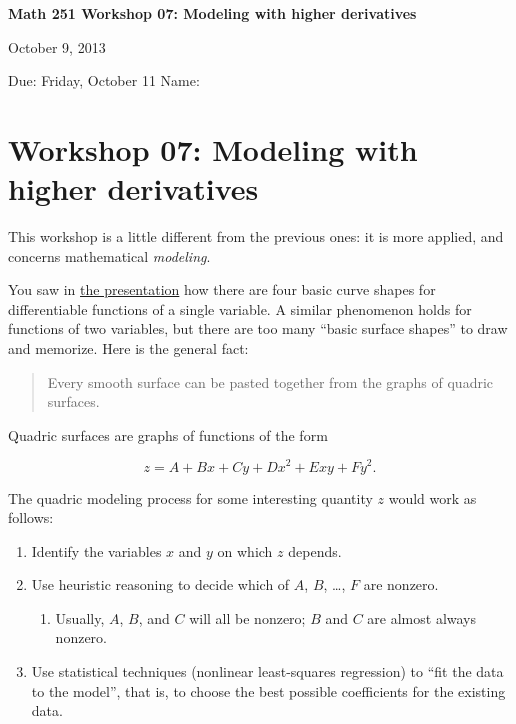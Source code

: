 \documentclass[12pt]{exam}
\theoremstyle{definition}
\begin{document}
\noindent
\textbf{{\large Math 251 \hfill Workshop 07: Modeling with higher derivatives}}

\noindent
October 9, 2013 

\noindent
Due: Friday, October 11 \hfill Name: \underline{\hspace{3in}} 

\noindent

\section{Workshop 07: Modeling with higher derivatives}

This workshop is a little different from the previous ones: it is more
applied, and concerns mathematical \emph{modeling}.

You saw in \href{../../decks/08/Deck.pdf}{the presentation} how there
are four basic curve shapes for differentiable functions of a single
variable. A similar phenomenon holds for functions of two variables, but
there are too many ``basic surface shapes'' to draw and memorize. Here
is the general fact:

\begin{quote}
Every smooth surface can be pasted together from the graphs of quadric
surfaces.
\end{quote}

Quadric surfaces are graphs of functions of the form

\[z = A + Bx + Cy + Dx^2 + Exy + Fy^2.\]

The quadric modeling process for some interesting quantity $z$ would
work as follows:

\begin{enumerate}
\def\labelenumi{\arabic{enumi}.}
\itemsep1pt\parskip0pt
\item
  Identify the variables $x$ and $y$ on which $z$ depends.
\item
  Use heuristic reasoning to decide which of $A$, $B$, \ldots{}, $F$ are
  nonzero.

  \begin{enumerate}
  \def\labelenumii{\alph{enumii}.}
  \itemsep1pt\parskip0pt
  \item
    Usually, $A$, $B$, and $C$ will all be nonzero; $B$ and $C$ are
    almost always nonzero.
  \end{enumerate}
\item
  Use statistical techniques (nonlinear least-squares regression) to
  ``fit the data to the model'', that is, to choose the best possible
  coefficients for the existing data.
\end{enumerate}
\end{document}
